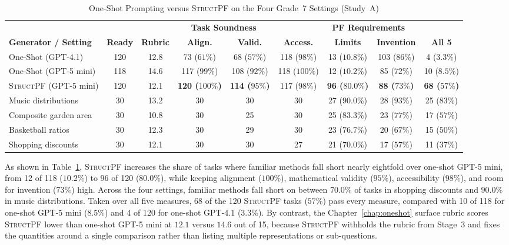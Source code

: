 \begin{table}[!htb]
    \centering
    \caption[One-Shot Prompting versus \textsc{StructPF} on the Four Grade 7 Settings (Study A)]{One-Shot Prompting versus \textsc{StructPF} on the Four Grade~7 Settings (Study~A)}
    \label{tab:res-structpf-fixed}
    \footnotesize
    \setlength{\tabcolsep}{3.4pt}
    \begin{tabular}{@{}lcccccccc@{}}
        \toprule
        & & & \multicolumn{2}{c}{\textbf{Task Soundness}} & \multicolumn{4}{c}{\textbf{PF Requirements}} \\
        \cmidrule(lr){4-5} \cmidrule(l){6-9}
        \textbf{Generator / Setting} & \textbf{Ready} & \textbf{Rubric} & \textbf{Align.} & \textbf{Valid.} & \textbf{Access.} & \textbf{Limits} & \textbf{Invention} & \textbf{All 5} \\
        \midrule
        One-Shot (GPT-4.1) & 120 & 12.8 & 73 ($61\%$) & 68 ($57\%$) & 118 ($98\%$) & 13 ($10.8\%$) & 103 ($86\%$) & 4 ($3.3\%$) \\
        One-Shot (GPT-5 mini) & 118 & 14.6 & 117 ($99\%$) & 108 ($92\%$) & 118 ($100\%$) & 12 ($10.2\%$) & 85 ($72\%$) & 10 ($8.5\%$) \\
        \textsc{StructPF} (GPT-5 mini) & 120 & 12.1 & \textbf{120 ($100\%$)} & \textbf{114 ($95\%$)} & 117 ($98\%$) & \textbf{96 ($80.0\%$)} & \textbf{88 ($73\%$)} & \textbf{68 ($57\%$)} \\
        \midrule
        \quad Music distributions & 30 & 13.2 & 30 & 30 & 30 & 27 ($90.0\%$) & 28 ($93\%$) & 25 ($83\%$) \\
        \quad Composite garden area & 30 & 10.8 & 30 & 25 & 30 & 25 ($83.3\%$) & 23 ($77\%$) & 17 ($57\%$) \\
        \quad Basketball ratios & 30 & 12.3 & 30 & 29 & 30 & 23 ($76.7\%$) & 20 ($67\%$) & 15 ($50\%$) \\
        \quad Shopping discounts & 30 & 12.1 & 30 & 30 & 27 & 21 ($70.0\%$) & 17 ($57\%$) & 11 ($37\%$) \\
        \bottomrule
    \end{tabular}
\end{table}

As shown in Table~\ref{tab:res-structpf-fixed}, \textsc{StructPF} increases the share of tasks where familiar methods fall short nearly eightfold over one-shot GPT-5 mini, from 12 of 118 ($10.2\%$) to 96 of 120 ($80.0\%$), while keeping alignment ($100\%$), mathematical validity ($95\%$), accessibility ($98\%$), and room for invention ($73\%$) high. Across the four settings, familiar methods fall short on between $70.0\%$ of tasks in shopping discounts and $90.0\%$ in music distributions. Taken over all five measures, 68 of the 120 \textsc{StructPF} tasks ($57\%$) pass every measure, compared with 10 of 118 for one-shot GPT-5 mini ($8.5\%$) and 4 of 120 for one-shot GPT-4.1 ($3.3\%$). By contrast, the Chapter~\ref{chap:oneshot} surface rubric scores \textsc{StructPF} lower than one-shot GPT-5 mini at $12.1$ versus $14.6$ out of 15, because \textsc{StructPF} withholds the rubric from Stage~3 and fixes the quantities around a single comparison rather than listing multiple representations or sub-questions.

